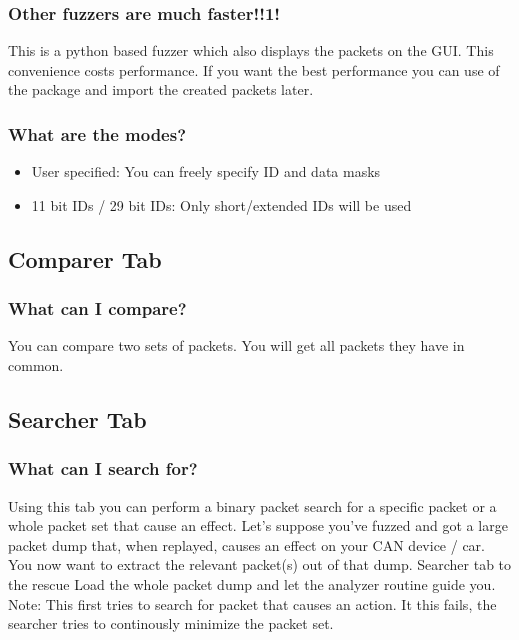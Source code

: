 \documentclass[letterpaper,10pt,english]{sphinxmanual}
\begin{document}
\subsubsection{Other fuzzers are much faster!!1!}
\label{\detokenize{manual.fuzzertab:other-fuzzers-are-much-faster-1}}
This is a python based fuzzer which also displays the packets on the GUI.
This convenience costs performance. If you want the best performance
you can use  of the  package and import the
created packets later.


\subsubsection{What are the modes?}
\label{\detokenize{manual.fuzzertab:what-are-the-modes}}\begin{itemize}
\item {} 
User specified: You can freely specify ID and data masks

\item {} 
11 bit IDs / 29 bit IDs: Only short/extended IDs will be used

\end{itemize}


\subsection{Comparer Tab}
\label{\detokenize{manual.comparertab:comparer-tab}}\label{\detokenize{manual.comparertab::doc}}

\subsubsection{What can I compare?}
\label{\detokenize{manual.comparertab:what-can-i-compare}}
You can compare two sets of packets. You will get all packets
they have in common.


\subsection{Searcher Tab}
\label{\detokenize{manual.searchertab::doc}}\label{\detokenize{manual.searchertab:searcher-tab}}

\subsubsection{What can I search for?}
\label{\detokenize{manual.searchertab:what-can-i-search-for}}
Using this tab you can perform a binary packet search for a
specific packet or a whole packet set that cause an effect.
Let’s suppose you’ve fuzzed and got a large packet dump that, when
replayed, causes an effect on your CAN device / car. You now want to
extract the relevant packet(s) out of that dump. Searcher tab to the
rescue \textendash{} Load the whole packet dump and let the analyzer routine
guide you.
Note: This first tries to search for  packet that causes an action.
It this fails, the searcher tries to continously minimize the packet set.
\end{document}

